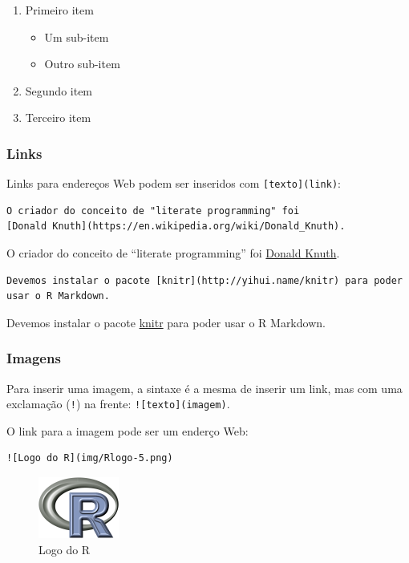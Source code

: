 \documentclass[
  10pt,
  a4paper]{book}
\providecommand{\tightlist}{%
  \setlength{\itemsep}{0pt}\setlength{\parskip}{0pt}}
\begin{document}
\begin{enumerate}
\def\labelenumi{\arabic{enumi}.}
\tightlist
\item
  Primeiro item

  \begin{itemize}
  \tightlist
  \item
    Um sub-item
  \item
    Outro sub-item
  \end{itemize}
\item
  Segundo item
\item
  Terceiro item
\end{enumerate}

\hypertarget{links}{%
\subsubsection*{Links}\label{links}}


Links para endereços Web podem ser inseridos com \texttt{{[}texto{]}(link)}:

\begin{verbatim}
O criador do conceito de "literate programming" foi
[Donald Knuth](https://en.wikipedia.org/wiki/Donald_Knuth).
\end{verbatim}

O criador do conceito de ``literate programming'' foi
\href{https://en.wikipedia.org/wiki/Donald_Knuth}{Donald Knuth}.

\begin{verbatim}
Devemos instalar o pacote [knitr](http://yihui.name/knitr) para poder
usar o R Markdown.
\end{verbatim}

Devemos instalar o pacote \href{http://yihui.name/knitr}{knitr} para poder
usar o R Markdown.

\hypertarget{imagens}{%
\subsubsection*{Imagens}\label{imagens}}


Para inserir uma imagem, a sintaxe é a mesma de inserir um link, mas com
uma exclamação (\texttt{!}) na frente: \texttt{!{[}texto{]}(imagem)}.

O link para a imagem pode ser um enderço Web:

\begin{verbatim}
![Logo do R](img/Rlogo-5.png)
\end{verbatim}

\begin{figure}
\centering
\includegraphics{img/Rlogo-5.png}
\caption{Logo do R}
\end{figure}
\end{document}
